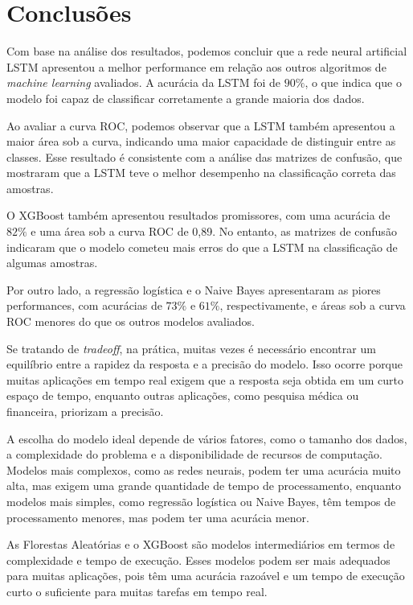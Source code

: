 \section{Conclusões}
\label{sec:conclu}

Com base na análise dos resultados, podemos concluir que a rede neural artificial LSTM apresentou a melhor performance em relação aos outros algoritmos de \textit{machine learning} avaliados. A acurácia da LSTM foi de $90\%$, o que indica que o modelo foi capaz de classificar corretamente a grande maioria dos dados.

Ao avaliar a curva ROC, podemos observar que a LSTM também apresentou a maior área sob a curva, indicando uma maior capacidade de distinguir entre as classes. Esse resultado é consistente com a análise das matrizes de confusão, que mostraram que a LSTM teve o melhor desempenho na classificação correta das amostras.

O XGBoost também apresentou resultados promissores, com uma acurácia de $82\%$ e uma área sob a curva ROC de 0,89. No entanto, as matrizes de confusão indicaram que o modelo cometeu mais erros do que a LSTM na classificação de algumas amostras.

Por outro lado, a regressão logística e o Naive Bayes apresentaram as piores performances, com acurácias de $73\%$ e $61\%$, respectivamente, e áreas sob a curva ROC menores do que os outros modelos avaliados.

Se tratando de \textit{tradeoff}, na prática, muitas vezes é necessário encontrar um equilíbrio entre a rapidez da resposta e a precisão do modelo. Isso ocorre porque muitas aplicações em tempo real exigem que a resposta seja obtida em um curto espaço de tempo, enquanto outras aplicações, como pesquisa médica ou financeira, priorizam a precisão.

A escolha do modelo ideal depende de vários fatores, como o tamanho dos dados, a complexidade do problema e a disponibilidade de recursos de computação. Modelos mais complexos, como as redes neurais, podem ter uma acurácia muito alta, mas exigem uma grande quantidade de tempo de processamento, enquanto modelos mais simples, como regressão logística ou Naive Bayes, têm tempos de processamento menores, mas podem ter uma acurácia menor.

As Florestas Aleatórias e o XGBoost são modelos intermediários em termos de complexidade e tempo de execução. Esses modelos podem ser mais adequados para muitas aplicações, pois têm uma acurácia razoável e um tempo de execução curto o suficiente para muitas tarefas em tempo real.

